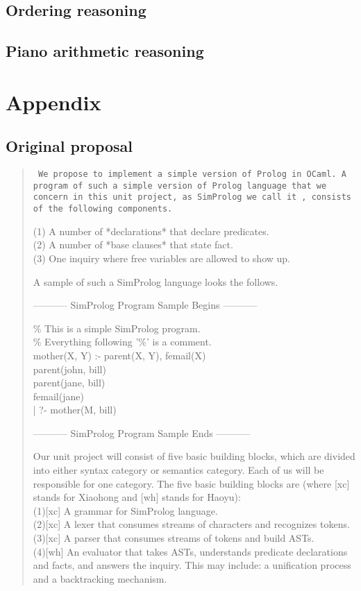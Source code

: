 \documentclass{article}
\begin{document}
\subsection{Ordering reasoning}

\subsection{Piano arithmetic reasoning}

\section*{Appendix}
\subsection*{Original proposal}
\begin{quote}
	\tt
	We propose to implement a simple version of Prolog
	in OCaml. A program of such a simple version of Prolog
	language that we concern in this unit project, as SimProlog 
	we call it , consists of the following components.
	
	(1) A number of *declarations* that declare predicates.\\
	(2) A number of *base clauses* that state fact.\\
	(3) One inquiry where free variables are allowed to show up.
	
	A sample of such a SimProlog language looks the follows.
	\begin{center}
		----------- SimProlog Program Sample Begins -----------
	\end{center}
	
	\% This is a simple SimProlog program.\\
	\% Everything following '\%' is a comment.\\
	
	mother(X, Y) :- parent(X, Y), femail(X)\\
	parent(john, bill)\\
	parent(jane, bill)\\
	femail(jane)\\
	| ?- mother(M, bill)
\begin{center}
		----------- SimProlog Program Sample Ends -----------
\end{center}
	
	Our unit project will consist of five basic building
	blocks, which are divided into either syntax category or
	semantics category. Each of us will be responsible for
	one category. The five basic building blocks are (where [xc] stands for Xiaohong and [wh] stands for Haoyu):\\
	(1)[xc] A grammar for SimProlog language.\\
	(2)[xc] A lexer that consumes streams of characters and
	recognizes tokens.\\
	(3)[xc] A parser that consumes streams of tokens and build
	ASTs.\\
	(4)[wh] An evaluator that takes ASTs, understands predicate
	declarations and facts, and answers the inquiry. This may
	include: a unification process and a backtracking mechanism.
\end{quote}
\end{document}
